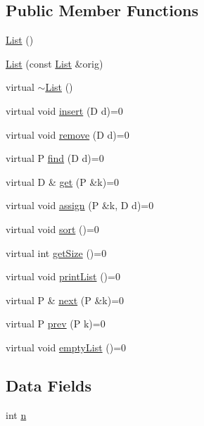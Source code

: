 \subsection*{Public Member Functions}
\begin{DoxyCompactItemize}
\item 
\hyperlink{classList_a3deb54ab4f51c6c39aa4015f258b5812}{List} ()
\item 
\hyperlink{classList_af8bcd7dae1bc30af2158075482c3d8d9}{List} (const \hyperlink{classList}{List} \&orig)
\item 
virtual \hyperlink{classList_a624593fb77847bf7ad4cacfba3442471}{$\sim$\+List} ()
\item 
virtual void \hyperlink{classList_a01f588d87d47f8332928eca38f7b11bb}{insert} (D d)=0
\item 
virtual void \hyperlink{classList_a14fc4e853102018df78db3899aa00d71}{remove} (D d)=0
\item 
virtual P \hyperlink{classList_a2b40d6fffc7b2fb5138b648f52c839ee}{find} (D d)=0
\item 
virtual D \& \hyperlink{classList_afb5a777f30a186adce69028c387bf413}{get} (P \&k)=0
\item 
virtual void \hyperlink{classList_a413440e7e102c944bec31ad5dce30b27}{assign} (P \&k, D d)=0
\item 
virtual void \hyperlink{classList_ae3795939f27cf3e688cd470450e0c27a}{sort} ()=0
\item 
virtual int \hyperlink{classList_af213bbcf13ee436a0f04cde66e337672}{get\+Size} ()=0
\item 
virtual void \hyperlink{classList_a8b34931e187e7e6b86aad86510ce4f3b}{print\+List} ()=0
\item 
virtual P \& \hyperlink{classList_afa9ca2c678bc4f7d15ab0f4ab7c45421}{next} (P \&k)=0
\item 
virtual P \hyperlink{classList_acc1831ae92a288345ef20cb29f3846b2}{prev} (P k)=0
\item 
virtual void \hyperlink{classList_a24b4f177a70215980e81ef7b2981fa1e}{empty\+List} ()=0
\end{DoxyCompactItemize}
\subsection*{Data Fields}
\begin{DoxyCompactItemize}
\item 
int \hyperlink{classList_aa61221b9bda8b2b56a61bd869daacbfd}{n}
\end{DoxyCompactItemize}



